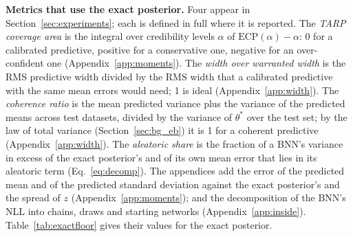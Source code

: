 \documentclass[11pt]{article}
\begin{document}
\textbf{Metrics that use the exact posterior.} Four appear in Section~\ref{sec:experiments}; each is defined in full
where it is reported. The \emph{TARP coverage area} is the integral over credibility levels $\alpha$ of
$\mathrm{ECP}(\alpha)-\alpha$: 0 for a calibrated predictive, positive for a conservative one, negative for an
over-confident one (Appendix~\ref{app:moments}). The \emph{width over warranted width} is the RMS predictive width
divided by the RMS width that a calibrated predictive with the same mean errors would need; 1 is ideal
(Appendix~\ref{app:width}). The \emph{coherence ratio} is the mean predicted variance plus the variance of the predicted
means across test datasets, divided by the variance of $\theta^\ast$ over the test set; by the law of total variance
(Section~\ref{sec:bg_eb}) it is 1 for a coherent predictive (Appendix~\ref{app:width}). The \emph{aleatoric share} is
the fraction of a BNN's variance in excess of the exact posterior's and of its own mean error that lies in its
aleatoric term (Eq.~\eqref{eq:decomp}). The appendices add the error of the predicted mean and of the predicted
standard deviation against the exact posterior's and the spread of $z$ (Appendix~\ref{app:moments}); and the decomposition of the BNN's NLL into chains, draws and
starting networks (Appendix~\ref{app:inside}). Table~\ref{tab:exactfloor} gives their values for the exact posterior.
\end{document}
